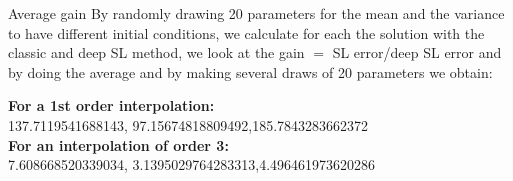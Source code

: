 \begin{frame}{Average gain}
    By  randomly  drawing  20  parameters  for  the  mean  and  the  variance  to  have different  initial  conditions,  
    we  calculate  for  each  the  solution with the  classic and deep SL method, we look at the gain $=$ SL error/deep SL error 
    and by doing the average and by making several draws of 20 parameters we obtain:
   
    \vspace{0.3cm}

    \textbf{For a 1st order interpolation:}\\

    137.7119541688143, 97.15674818809492,185.7843283662372\\
    
    \textbf{For an interpolation of order 3:}\\
    
    7.608668520339034, 3.1395029764283313,4.496461973620286
 
   
     
\end{frame}
